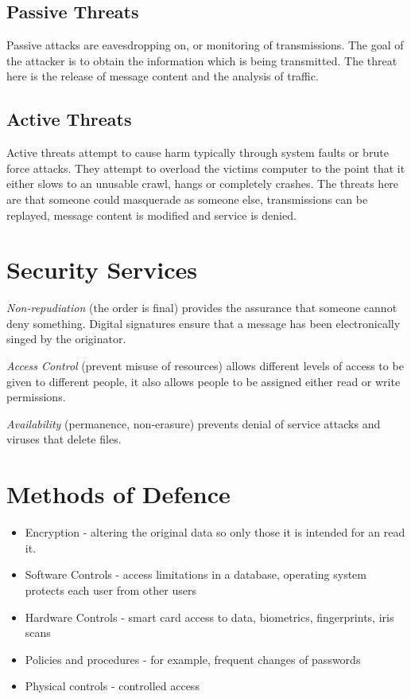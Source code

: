 \subsection*{Passive Threats}
Passive attacks are eavesdropping on, or monitoring of transmissions. The goal of the attacker is to obtain the information which is being transmitted. The threat here is the release of message content and the analysis of traffic.
\subsection*{Active Threats}
Active threats attempt to cause harm typically through system faults or brute force attacks. They attempt to overload the victims computer to the point that it either slows to an unusable crawl, hangs or completely crashes. The threats here are that someone could masquerade as someone else, transmissions can be replayed, message content is modified and service is denied.

\section*{Security Services}
\textit{Non-repudiation} (the order is final) provides the assurance that someone cannot deny something. Digital signatures ensure that a message has been electronically singed by the originator.

\textit{Access Control} (prevent misuse of resources) allows different levels of access to be given to different people, it also allows people to be assigned either read or write permissions.

\textit{Availability} (permanence, non-erasure) prevents denial of service attacks and viruses that delete files.

\section*{Methods of Defence}
\begin{itemize}
    \item Encryption - altering the original data so only those it is intended for an read it.
    \item Software Controls - access limitations in a database, operating system protects each user from other users
    \item Hardware Controls - smart card access to data, biometrics, fingerprints, iris scans
    \item Policies and procedures - for example, frequent changes of passwords
    \item Physical controls - controlled access
\end{itemize}

